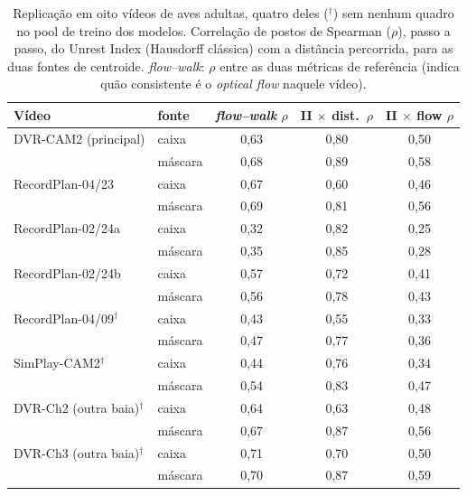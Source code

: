 \begin{table}[htbp]
  \centering
  \caption{Replicação em oito vídeos de aves adultas, quatro deles ($^{\dagger}$) sem nenhum quadro no pool de treino dos modelos. Correlação de postos de Spearman ($\rho$), passo a passo, do Unrest Index (Hausdorff clássica) com a distância percorrida, para as duas fontes de centroide. \emph{flow--walk}: $\rho$ entre as duas métricas de refer\^encia (indica quão consistente é o \emph{optical flow} naquele vídeo).}
  \label{tab:replicacao}
  \footnotesize\setlength{\tabcolsep}{5pt}
  \begin{tabular}{llccc}
    \toprule
    Vídeo & fonte & \emph{flow--walk} $\rho$ & II $\times$ dist.\ $\rho$ & II $\times$ flow $\rho$ \\
    \midrule
    DVR-CAM2 (principal) & caixa & 0,63 & 0,80 & 0,50 \\
     & máscara & 0,68 & 0,89 & 0,58 \\
    \midrule
    RecordPlan-04/23 & caixa & 0,67 & 0,60 & 0,46 \\
     & máscara & 0,69 & 0,81 & 0,56 \\
    \midrule
    RecordPlan-02/24a & caixa & 0,32 & 0,82 & 0,25 \\
     & máscara & 0,35 & 0,85 & 0,28 \\
    \midrule
    RecordPlan-02/24b & caixa & 0,57 & 0,72 & 0,41 \\
     & máscara & 0,56 & 0,78 & 0,43 \\
    \midrule
    RecordPlan-04/09$^{\dagger}$ & caixa & 0,43 & 0,55 & 0,33 \\
     & máscara & 0,47 & 0,77 & 0,36 \\
    \midrule
    SimPlay-CAM2$^{\dagger}$ & caixa & 0,44 & 0,76 & 0,34 \\
     & máscara & 0,54 & 0,83 & 0,47 \\
    \midrule
    DVR-Ch2 (outra baia)$^{\dagger}$ & caixa & 0,64 & 0,63 & 0,48 \\
     & máscara & 0,67 & 0,87 & 0,56 \\
    \midrule
    DVR-Ch3 (outra baia)$^{\dagger}$ & caixa & 0,71 & 0,70 & 0,50 \\
     & máscara & 0,70 & 0,87 & 0,59 \\
    \bottomrule
  \end{tabular}
\end{table}
